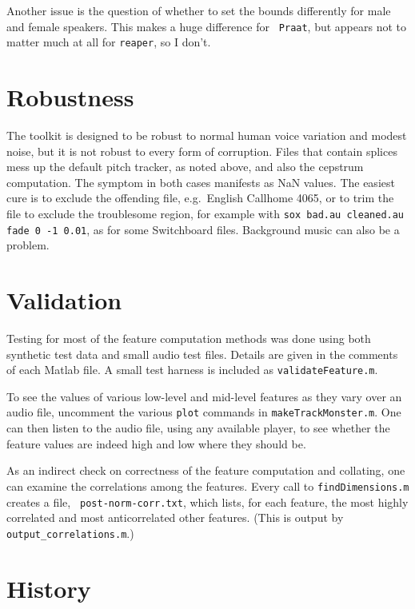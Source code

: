 \documentclass[11pt]{article}
\begin{document}
Another issue is the question of whether to set the bounds differently
for male and female speakers.  This makes a huge difference for {\tt
  Praat}, but appears not to matter much at all for {\tt reaper}, so I
don't.


\section{Robustness}           \label{sec:robustness}

The toolkit is designed to be robust to normal human voice variation
and modest noise, but it is not robust to every form of
corruption. Files that contain splices mess up the default pitch
tracker, as noted above, and also the cepstrum computation.  The
symptom in both cases manifests as NaN values.  The easiest cure is to
exclude the offending file, e.g.\ English Callhome 4065, or to trim the
file to exclude the troublesome region, for example with {\tt sox
  bad.au cleaned.au fade 0 -1 0.01}, as for some Switchboard files.
Background music can also be a problem.


\section{Validation}   \label{sec:validation}

Testing for most of the feature computation methods was done using
both synthetic test data and small audio test files.  Details are
given in the comments of each Matlab file.  A small test harness is
included as {\tt validateFeature.m}.

To see the values of various low-level and mid-level features as they
vary over an audio file, uncomment the various {\tt plot} commands in
{\tt makeTrackMonster.m}.  One can then listen to the audio file,
using any available player, to see whether the feature values are
indeed high and low where they should be.

As an indirect check on correctness of the feature computation and
collating, one can examine the correlations among the features.  Every
call to {\tt findDimensions.m} creates a file, {\tt
  post-norm-corr.txt}, which lists, for each feature, the most highly
correlated and most anticorrelated other features.  (This is output by
{\tt output\_correlations.m}.)


\section{History}           \label{sec:history}
\end{document}

